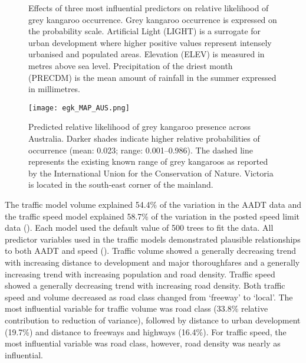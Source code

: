 \begin{figure*}[!h]%
  \centering%
  \caption[Effects of predictor variables on relative likelihood of grey kangaroo occurrence]{Effects of three most influential predictors on relative likelihood of grey kangaroo occurrence. Grey kangaroo occurrence  is expressed on the probability scale. Artificial Light (LIGHT) is a surrogate for urban development where higher positive values represent intensely urbanised and populated areas. Elevation (ELEV) is measured in metres above sea level. Precipitation of the driest month (PRECDM) is the mean amount of rainfall in the summer expressed in millimetres.}%
  \label{egk_sdm_vars}
\end{figure*}

\begin{figure*}[!t]
  \centering
  \texttt{[image: egk\_MAP\_AUS.png]}
  \caption[Predicted relative likelihood of grey kangaroo presence across Australia]{Predicted relative likelihood of grey kangaroo presence across Australia. Darker shades indicate higher relative probabilities of occurrence (mean: 0.023; range: 0.001--0.986). The dashed line represents the existing known range of grey kangaroos as reported by the International Union for the Conservation of Nature. Victoria is located in the south-east corner of the mainland.}
  \label{egk_map_aus}
\end{figure*}

The traffic model volume explained 54.4\% of the variation in the AADT data and the traffic speed model explained 58.7\% of the variation in the posted speed limit data ().  Each model used the default value of 500 trees to fit the data.  All predictor variables used in the traffic models demonstrated plausible relationships to both AADT and speed (). Traffic volume showed a generally decreasing trend with increasing distance to development and major thoroughfares and a generally increasing trend with increasing population and road density. Traffic speed showed a generally decreasing trend with increasing road density. Both traffic speed and volume decreased as road class changed from `freeway' to `local'. The most influential variable for traffic volume was road class (33.8\% relative contribution to reduction of variance), followed by distance to urban development (19.7\%) and distance to freeways and highways (16.4\%). For traffic speed, the most influential variable was road class, however, road density was nearly as influential.

